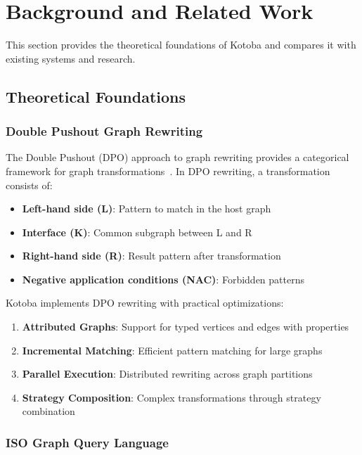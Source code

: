 \documentclass[11pt,a4paper]{article}
\begin{document}
\section{Background and Related Work}
\label{sec:background}

This section provides the theoretical foundations of Kotoba and compares it with existing systems and research.

\subsection{Theoretical Foundations}
\label{subsec:theory}

\subsubsection{Double Pushout Graph Rewriting}
\label{subsubsec:dpo}

The Double Pushout (DPO) approach to graph rewriting provides a categorical framework for graph transformations~\cite{ehrig1973}. In DPO rewriting, a transformation consists of:

\begin{itemize}
\item \textbf{Left-hand side (L)}: Pattern to match in the host graph
\item \textbf{Interface (K)}: Common subgraph between L and R
\item \textbf{Right-hand side (R)}: Result pattern after transformation
\item \textbf{Negative application conditions (NAC)}: Forbidden patterns
\end{itemize}

Kotoba implements DPO rewriting with practical optimizations:
\begin{enumerate}
\item \textbf{Attributed Graphs}: Support for typed vertices and edges with properties
\item \textbf{Incremental Matching}: Efficient pattern matching for large graphs
\item \textbf{Parallel Execution}: Distributed rewriting across graph partitions
\item \textbf{Strategy Composition}: Complex transformations through strategy combination
\end{enumerate}

\subsubsection{ISO Graph Query Language}
\label{subsubsec:gql}
\end{document}
